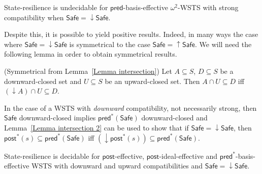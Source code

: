 \documentclass[runningheads]{llncs}
\newcommand{\pred}{\textsf{pred}}
\newcommand{\post}{\textsf{post}}
\newcommand{\Safe}{\textsf{Safe}}
\begin{document}
\begin{proposition}\label{srp down up}
{\sc State-resilience} is undecidable for 
 $\pred$-basis-effective $\omega^2$-WSTS with strong compatibility
when
$\Safe=\mathop{\downarrow} \Safe$.
\end{proposition}



Despite this, it is possible to yield positive results. Indeed, in many ways the case where $\Safe = \mathop{\downarrow} \Safe$
is symmetrical to the case $\Safe = \mathop{\uparrow} \Safe$.
%
We will need the following lemma in order to obtain symmetrical results.

\begin{lemma}(Symmetrical from Lemma~\ref{Lemma intersection})\label{Lemma intersection 2}
Let $A \subseteq S$, $D \subseteq S$ be a downward-closed set and $U \subseteq S$ be an upward-closed set. 
Then $A \cap U \subseteq D$  iff $ (\mathop{\downarrow}  A) \cap U \subseteq D$.
\end{lemma}




In the case of a WSTS with \emph{downward} compatibility, not necessarily strong,
then $\Safe$ downward-closed implies $\pred^*(\Safe)$ downward-closed and
Lemma~\ref{Lemma intersection 2} can be used to show that
if $\Safe = \mathop{\downarrow} \Safe$,
then
$\post^*(s)  
\subseteq \pred^*(\Safe)$  iff $ (\mathop{\downarrow}  \post^*(s)) 
\subseteq \pred^*(\Safe)$.


\begin{theorem}\label{downward srp}
{\sc State-resilience} is decidable for $\post$-effective, 
$\post$-ideal-effective and $\pred^*$-basis-effective WSTS with downward and upward compatibilities
and $\Safe = \mathop{\downarrow} \Safe$.
\end{theorem}
\end{document}
